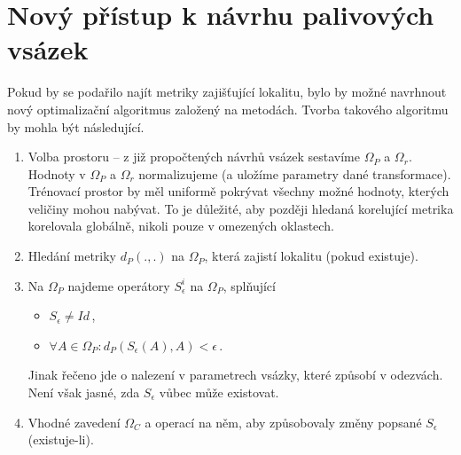 \section{Nový přístup k návrhu palivových vsázek}
Pokud by se podařilo najít metriky zajišťující lokalitu, bylo by možné navrhnout nový optimalizační algoritmus založený na  metodách. 
Tvorba takového algoritmu by mohla být následující.
\begin{enumerate}
	\item Volba  prostoru -- z již propočtených návrhů vsázek sestavíme $\Omega_P$ a $\Omega_r$. Hodnoty v $\Omega_P$ a 
		$\Omega_r$ normalizujeme (a uložíme parametry dané transformace). Trénovací prostor by měl uniformě pokrývat všechny možné hodnoty, kterých 
		veličiny mohou nabývat. To je důležité, aby později hledaná korelující metrika korelovala globálně, nikoli pouze v omezených oklastech.
	\item Hledání metriky $d_P (.,.)$ na $\Omega_P$, která zajistí lokalitu (pokud existuje).
	\item Na $\Omega_P$ najdeme operátory $S_{\epsilon}^{i}$ na $\Omega_P$, splňující 
		\begin{itemize}
			\item $S_{\epsilon} \neq Id$\,,
			\item $\forall A\in \Omega_P: d_P (S_{\epsilon}(A), A) < \epsilon$\,.
		\end{itemize}
		Jinak řečeno jde o nalezení  v parametrech vsázky, které způsobí  v odezvách. Není však jasné, zda 
		$S_{\epsilon}$ vůbec může existovat.
	\item Vhodné zavedení $\Omega_C$ a operací na něm, aby způsobovaly změny popsané $S_{\epsilon}$ (existuje-li). 
	
\end{enumerate}


